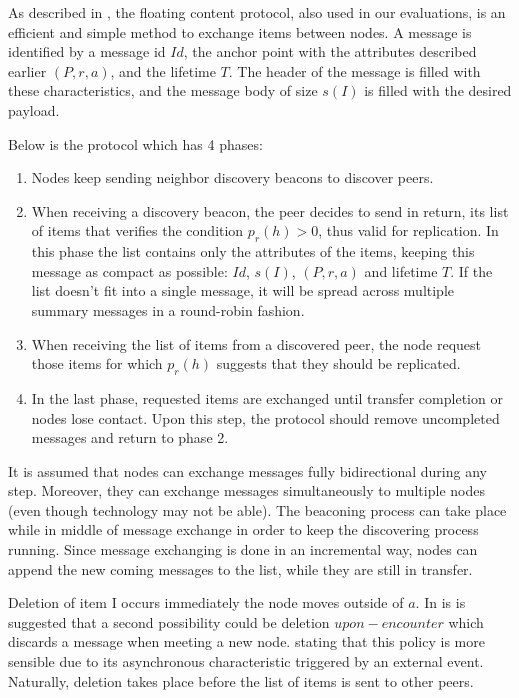As described in \cite{percomfloatingcontent}, the floating content protocol,
also used in our evaluations, is an efficient and simple method to exchange
items between nodes. A message is identified by a message id $Id$, the anchor point
with the attributes described earlier $(P, r, a)$, and the lifetime $T$. The
header of the message is filled with these characteristics, and the message body
of size $s(I)$ is filled with the desired payload.

Below is the protocol which has 4 phases:

\begin{enumerate}[1.]
  \item Nodes keep sending neighbor discovery beacons to discover peers.
  \item When receiving a discovery beacon, the peer decides to send in return,
  its list of items that verifies the condition $p_r(h) > 0$, thus valid for
  replication. In this phase the list contains only the attributes of the items,
  keeping this message as compact as possible: $Id$, $s(I)$, $(P, r, a)$ and
  lifetime $T$. If the list doesn't fit into a single message, it will be spread
  across multiple summary messages in a round-robin fashion.
  \item When receiving the list of items from a discovered peer, the node
  request those items for which $p_r(h)$ suggests that they should be replicated.
  \item In the last phase, requested items are exchanged until transfer
  completion or nodes lose contact. Upon this step, the protocol should remove
  uncompleted messages and return to phase 2.
\end{enumerate}

It is assumed that nodes can exchange messages fully bidirectional during any
step. Moreover, they can exchange messages simultaneously to multiple nodes
(even though technology may not be able). The beaconing process can take place
while in middle of message exchange in order to keep the discovering process
running. Since message exchanging is done in an incremental way, nodes can
append the new coming messages to the list, while they are still in transfer.

Deletion of item I occurs immediately the node moves outside of $a$. In
\cite{percomfloatingcontent} is is suggested that a second possibility could be
deletion $upon-encounter$ which discards a message when meeting a new node.
stating that this policy is more sensible due to its asynchronous
characteristic triggered by an external event. Naturally, deletion takes place
before the list of items is sent to other peers.

